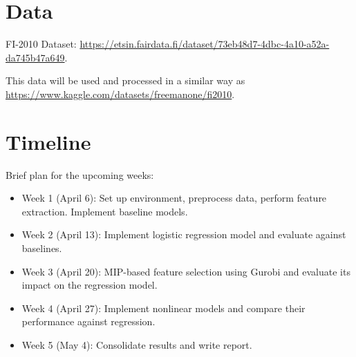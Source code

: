 \documentclass[11pt]{article}
\begin{document}
\section*{Data}
FI-2010 Dataset: \url{https://etsin.fairdata.fi/dataset/73eb48d7-4dbc-4a10-a52a-da745b47a649}.

This data will be used and processed in a similar way as \url{https://www.kaggle.com/datasets/freemanone/fi2010}.

\section*{Timeline}
Brief plan for the upcoming weeks:
\begin{itemize}
    \item Week 1 (April 6): Set up environment, preprocess data, perform feature extraction. Implement baseline models.
    \item Week 2 (April 13): Implement logistic regression model and evaluate against baselines.
    \item Week 3 (April 20): MIP-based feature selection using Gurobi and evaluate its impact on the regression model.
    \item Week 4 (April 27): Implement nonlinear models and compare their performance against regression.
    \item Week 5 (May 4): Consolidate results and write report.
\end{itemize}
\end{document}
